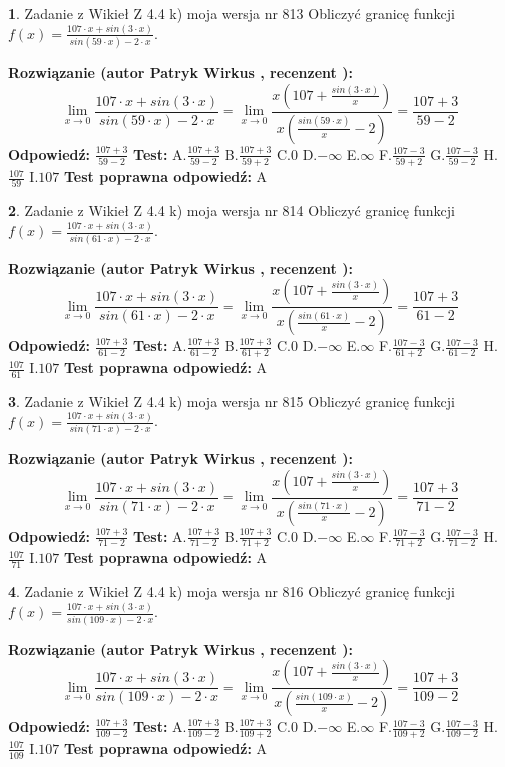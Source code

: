 \documentclass[12pt, a4paper]{article}
\theoremstyle{definition} %
\newtheorem{zad}{}
\newcommand{\zadStart}[1]{\begin{zad}#1\newline}
\newcommand{\zadStop}{\end{zad}}
\newcommand{\rozwStart}[2]{\noindent \textbf{Rozwiązanie (autor #1 , recenzent #2): }\newline}
\newcommand{\rozwStop}{\newline}
\newcommand{\odpStart}{\noindent \textbf{Odpowiedź:}\newline}
\newcommand{\odpStop}{\newline}
\newcommand{\testStart}{\noindent \textbf{Test:}\newline}
\newcommand{\testStop}{\newline}
\newcommand{\kluczStart}{\noindent \textbf{Test poprawna odpowiedź:}\newline}
\newcommand{\kluczStop}{\newline}
\begin{document}
\zadStart{Zadanie z Wikieł Z 4.4 k) moja wersja nr 813}
Obliczyć granicę funkcji $f(x)=\frac{107\cdot x +sin(3\cdot x)}{sin(59\cdot x) -2\cdot x}$.
\zadStop
\rozwStart{Patryk Wirkus}{}
$$\lim\limits_{x\to 0}\frac{107\cdot x +sin(3\cdot x)}{sin(59\cdot x) -2\cdot x}
=\lim\limits_{x\to 0}\frac{x(107+\frac{sin(3\cdot x)}{x})}{x(\frac{sin(59\cdot x)}{x}-2)}
=\frac{107+3}{59-2}$$
\rozwStop
\odpStart
$\frac{107+3}{59-2}$
\odpStop
\testStart
A.$\frac{107+3}{59-2}$
B.$\frac{107+3}{59+2}$
C.$0$
D.$-\infty$
E.$\infty$
F.$\frac{107-3}{59+2}$
G.$\frac{107-3}{59-2}$
H.$\frac{107}{59}$
I.$107$
\testStop
\kluczStart
A
\kluczStop



\zadStart{Zadanie z Wikieł Z 4.4 k) moja wersja nr 814}
Obliczyć granicę funkcji $f(x)=\frac{107\cdot x +sin(3\cdot x)}{sin(61\cdot x) -2\cdot x}$.
\zadStop
\rozwStart{Patryk Wirkus}{}
$$\lim\limits_{x\to 0}\frac{107\cdot x +sin(3\cdot x)}{sin(61\cdot x) -2\cdot x}
=\lim\limits_{x\to 0}\frac{x(107+\frac{sin(3\cdot x)}{x})}{x(\frac{sin(61\cdot x)}{x}-2)}
=\frac{107+3}{61-2}$$
\rozwStop
\odpStart
$\frac{107+3}{61-2}$
\odpStop
\testStart
A.$\frac{107+3}{61-2}$
B.$\frac{107+3}{61+2}$
C.$0$
D.$-\infty$
E.$\infty$
F.$\frac{107-3}{61+2}$
G.$\frac{107-3}{61-2}$
H.$\frac{107}{61}$
I.$107$
\testStop
\kluczStart
A
\kluczStop



\zadStart{Zadanie z Wikieł Z 4.4 k) moja wersja nr 815}
Obliczyć granicę funkcji $f(x)=\frac{107\cdot x +sin(3\cdot x)}{sin(71\cdot x) -2\cdot x}$.
\zadStop
\rozwStart{Patryk Wirkus}{}
$$\lim\limits_{x\to 0}\frac{107\cdot x +sin(3\cdot x)}{sin(71\cdot x) -2\cdot x}
=\lim\limits_{x\to 0}\frac{x(107+\frac{sin(3\cdot x)}{x})}{x(\frac{sin(71\cdot x)}{x}-2)}
=\frac{107+3}{71-2}$$
\rozwStop
\odpStart
$\frac{107+3}{71-2}$
\odpStop
\testStart
A.$\frac{107+3}{71-2}$
B.$\frac{107+3}{71+2}$
C.$0$
D.$-\infty$
E.$\infty$
F.$\frac{107-3}{71+2}$
G.$\frac{107-3}{71-2}$
H.$\frac{107}{71}$
I.$107$
\testStop
\kluczStart
A
\kluczStop



\zadStart{Zadanie z Wikieł Z 4.4 k) moja wersja nr 816}
Obliczyć granicę funkcji $f(x)=\frac{107\cdot x +sin(3\cdot x)}{sin(109\cdot x) -2\cdot x}$.
\zadStop
\rozwStart{Patryk Wirkus}{}
$$\lim\limits_{x\to 0}\frac{107\cdot x +sin(3\cdot x)}{sin(109\cdot x) -2\cdot x}
=\lim\limits_{x\to 0}\frac{x(107+\frac{sin(3\cdot x)}{x})}{x(\frac{sin(109\cdot x)}{x}-2)}
=\frac{107+3}{109-2}$$
\rozwStop
\odpStart
$\frac{107+3}{109-2}$
\odpStop
\testStart
A.$\frac{107+3}{109-2}$
B.$\frac{107+3}{109+2}$
C.$0$
D.$-\infty$
E.$\infty$
F.$\frac{107-3}{109+2}$
G.$\frac{107-3}{109-2}$
H.$\frac{107}{109}$
I.$107$
\testStop
\kluczStart
A
\kluczStop
\end{document}
